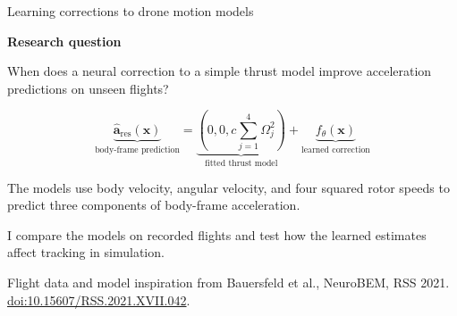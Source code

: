 \documentclass[11pt,aspectratio=169]{beamer}
\newcommand{\source}[1]{\par\vfill{\color{Muted}\fontsize{7}{8.5}\selectfont #1\par}}
\newcommand{\topic}[1]{\par{\color{Teal}\bfseries #1}\par\vspace{0.12cm}}
\begin{document}
\begin{frame}[t]{Learning corrections to drone motion models}
\par\vspace{0.32cm}
\topic{Research question}
When does a neural correction to a simple thrust model improve acceleration predictions on unseen flights?
\par\vspace{0.22cm}
\[
\underbrace{\widehat{\mathbf a}_{\mathrm{res}}(\mathbf x)}_{\text{body-frame prediction}}
=
\underbrace{(0,0,c\!\sum_{j=1}^{4}\Omega_j^2)}_{\text{fitted thrust model}}
+
\underbrace{f_\theta(\mathbf x)}_{\text{learned correction}}
\]
\par\vspace{0.20cm}
The models use body velocity, angular velocity, and four squared rotor speeds to predict three components of body-frame acceleration.
\par\vspace{0.22cm}
I compare the models on recorded flights and test how the learned estimates affect tracking in simulation.
\source{Flight data and model inspiration from Bauersfeld et al., NeuroBEM, RSS 2021. \href{https://doi.org/10.15607/RSS.2021.XVII.042}{doi:10.15607/RSS.2021.XVII.042}.}
\end{frame}
\end{document}
